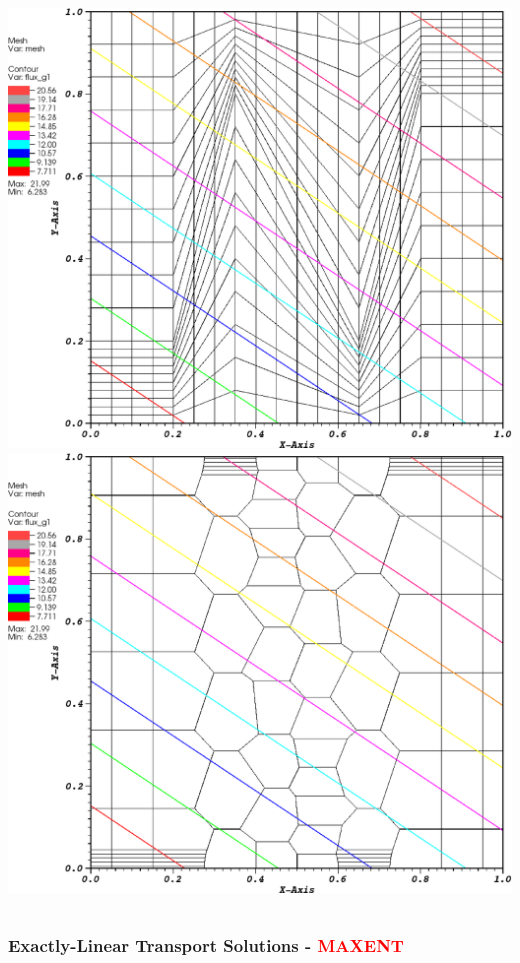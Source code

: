 \documentclass[compress,10pt]{beamer}
\newcommand{\tcr}[1]{\textcolor{red}{#1}}
\begin{document}
\begin{frame}[t]
{\begin{columns}
{}\includegraphics[width=0.95\columnwidth]{images/z_quad_MV_k1.eps} \\
\vspace{3mm}
{}\includegraphics[width=0.95\columnwidth]{images/z_poly_MV_k1.eps} 
\end{columns}
}
{
\frametitle{Exactly-Linear Transport Solutions - \tcr{MAXENT}}
\centering
\begin{columns}
\centering

\end{columns}}
\end{frame}
\end{document}

